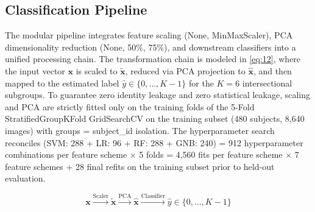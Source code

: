 \subsection{Classification Pipeline}
\label{sec:classification_pipeline_and_strategy}
\label{sec:classification_pipeline}

The modular pipeline integrates feature scaling (None, MinMaxScaler), PCA dimensionality reduction (None, 50\%, 75\%), and downstream classifiers into a unified processing chain. The transformation chain is modeled in \eqref{eq:12}, where the input vector $\mathbf{x}$ is scaled to $\tilde{\mathbf{x}}$, reduced via PCA projection to $\hat{\mathbf{x}}$, and then mapped to the estimated label $\hat{y} \in \{0, \dots, K-1\}$ for the $K = 6$ intersectional subgroups. To guarantee zero identity leakage and zero statistical leakage, scaling and PCA are strictly fitted only on the training folds of the 5-Fold StratifiedGroupKFold GridSearchCV on the training subset (480 subjects, 8,640 images) with groups = subject\_id isolation. The hyperparameter search reconciles (SVM: 288 + LR: 96 + RF: 288 + GNB: 240) = 912 hyperparameter combinations per feature scheme $\times$ 5 folds = 4,560 fits per feature scheme $\times$ 7 feature schemes + 28 final refits on the training subset prior to held-out evaluation.

\begin{equation}
\mathbf{x} \xrightarrow{\text{Scaler}} \tilde{\mathbf{x}} \xrightarrow{\text{PCA}} \hat{\mathbf{x}} \xrightarrow{\text{Classifier}} \hat{y} \in \{0, \dots, K-1\}
\label{eq:12}
\end{equation}
